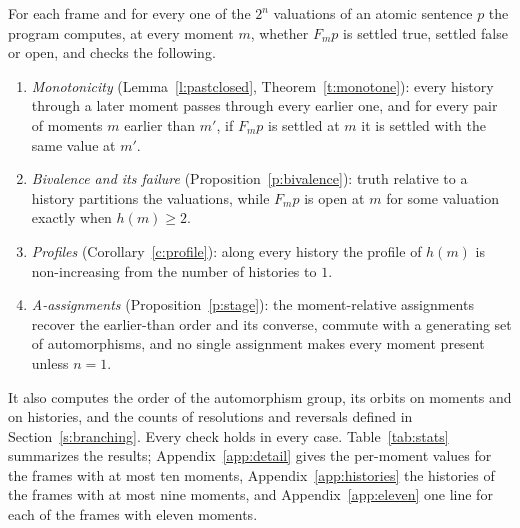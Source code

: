\documentclass{situationist-preprint}
\begin{document}
For each frame and for every one of the $2^n$ valuations of an atomic sentence $p$ the program computes, at every moment $m$, whether $F_m p$ is settled true, settled false or open, and checks the following.
\begin{enumerate}[label=(\roman*)]
\item \emph{Monotonicity} (Lemma~\ref{l:pastclosed}, Theorem~\ref{t:monotone}): every history through a later moment passes through every earlier one, and for every pair of moments $m$ earlier than $m'$, if $F_m p$ is settled at $m$ it is settled with the same value at $m'$.
\item \emph{Bivalence and its failure} (Proposition~\ref{p:bivalence}): truth relative to a history partitions the valuations, while $F_m p$ is open at $m$ for some valuation exactly when $h(m) \geq 2$.
\item \emph{Profiles} (Corollary~\ref{c:profile}): along every history the profile of $h(m)$ is non-increasing from the number of histories to $1$.
\item \emph{A-assignments} (Proposition~\ref{p:stage}): the moment-relative assignments recover the earlier-than order and its converse, commute with a generating set of automorphisms, and no single assignment makes every moment present unless $n = 1$.
\end{enumerate}
It also computes the order of the automorphism group, its orbits on moments and on histories, and the counts of resolutions and reversals defined in Section~\ref{s:branching}. Every check holds in every case. Table~\ref{tab:stats} summarizes the results; Appendix~\ref{app:detail} gives the per-moment values for the \NFramesDetail{} frames with at most ten moments, Appendix~\ref{app:histories} the histories of the frames with at most nine moments, and Appendix~\ref{app:eleven} one line for each of the \NFramesEleven{} frames with eleven moments.

\begin{table}[ht]
\centering

\caption{Summary of the enumeration by number of moments $n$. \emph{Frames}: isomorphism classes; \emph{labeled}: labeled trees canonicalized in the independent check; $\sum|H|$: total number of histories; \emph{linear}: frames with one history; \emph{rigid}: frames with trivial automorphism group; \emph{no fixed $h$}: frames in which no history is fixed by every automorphism; \emph{M checks}: instances of Theorem~\ref{t:monotone} checked (pairs $m < m'$ times valuations); \emph{resolutions} and \emph{reversals} as in Section~\ref{s:branching}.}
\label{tab:stats}
\end{table}
\end{document}
